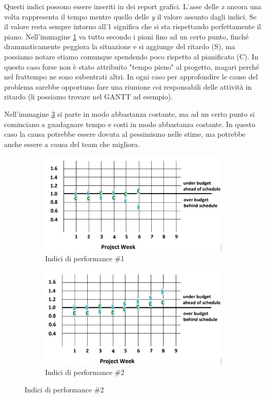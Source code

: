 \noindent Questi indici possono essere inseriti in dei report grafici. L'asse delle \textit{x} ancora una volta rappresenta il tempo mentre quello delle \textit{y} il valore assunto dagli indici. Se il valore resta sempre intorno all'1 significa che si sta rispettando perfettamente il piano. Nell'immagine \ref{perfind1} va tutto secondo i piani fino ad un certo punto, finché drammaticamente peggiora la situazione e si aggiunge del ritardo (S), ma possiamo notare stiamo comunque spendendo poco rispetto al pianificato (C). In questo caso forse non è stato attribuito "tempo pieno" al progetto, magari perché nel frattempo ne sono subentrati altri. In ogni caso per approfondire le cause del problema sarebbe opportuno fare una riunione coi responsabili delle attività in ritardo (li possiamo trovare nel GANTT ad esempio).

\noindent Nell'immagine \ref{perfind2} si parte in modo abbastanza costante, ma ad un certo punto si cominciano a guadagnare tempo e costi in modo abbastanza costante. In questo caso la causa potrebbe essere dovuta al pessimismo nelle stime, ma potrebbe anche essere a causa del team che migliora.

\begin{figure}[H]
	\centering
	\begin{subfigure}[b]{0.45\textwidth}
		\centering
		\includegraphics[width=\textwidth]{document/img/performance-indices-1.png}
		\caption{Indici di performance \#1}
		\label{perfind1}
	\end{subfigure}
	\hfill
	\begin{subfigure}[b]{0.45\textwidth}
		\centering
		\includegraphics[width=\textwidth]{document/img/performance-indices-2.png}
		\caption{Indici di performance \#2}
		\label{perfind2}
	\end{subfigure}
\end{figure}

